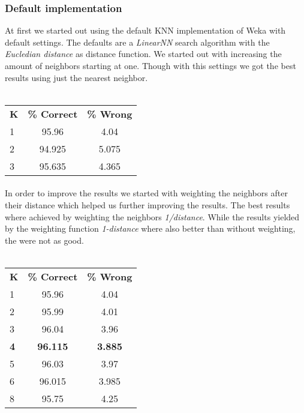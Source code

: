 \documentclass{sig-alternate-05-2015}
\begin{document}
{\subsubsection{Default implementation}
At first we started out using the default KNN implementation of Weka with default settings. The defaults are a \emph{LinearNN} search algorithm with the \emph{Eucledian distance} as distance function. We started out with increasing the amount of neighbors starting at one. Though with this settings we got the best results using just the nearest neighbor. 
\\\\
\begin{center}
\begin{tabular}{ l | c |c }
\textbf{K} & \textbf{\% Correct} & \textbf{\% Wrong} \\
1 & 95.96 & 4.04 \\
2 & 94.925 & 5.075 \\
3 & 95.635 & 4.365 \\
\end{tabular}
\end{center}
\paragraph{}In order to improve the results we started with weighting the neighbors after their distance which helped us further improving the results. The best results where achieved by weighting the neighbors \emph{1/distance}. While the results yielded by the weighting function \emph{1-distance} where also better than without weighting, the were not as good.
\\\\
\begin{center}
\begin{tabular}{ l | c | c }
\textbf{K} & \textbf{\% Correct} & \textbf{\% Wrong} \\
1 & 95.96 & 4.04 \\
2 & 95.99& 4.01\\
3 & 96.04 & 3.96 \\
\textbf{4} & \textbf{96.115} & \textbf{3.885} \\
5 & 96.03 & 3.97 \\
6 & 96.015 & 3.985 \\
8 & 95.75 & 4.25 \\
\end{tabular}
\end{center}
}
\end{document}
